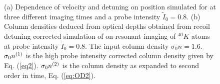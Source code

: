 \begin{figure}
\caption{(a) Dependence of velocity and detuning on position simulated for \K{} at three different imaging times and a probe intensity $\tilde{I}_0=0.8$. (b) Column densities deduced from optical depths obtained from recoil detuning corrected simulation of on-resonant imaging of $^{40}K$ atoms at probe intensity $\tilde{I}_0=0.8$. The input column density $\sigma_0 n=1.6$. $\sigma_0 n^{\rm{(1)}}$ is the high probe intensity corrected column density given by Eq. (\ref{eq2}). $\sigma_0 n^{\rm{(2)}}$ is the column density as expanded to second order in time, Eq. (\ref{eq:OD2}).}
\label{fig:expos}
\end{figure}
